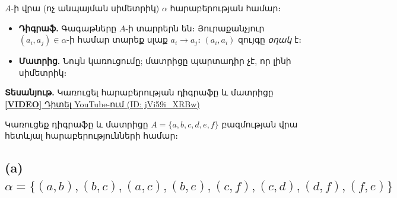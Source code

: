 \documentclass[12pt, a4paper]{article}
\begin{document}
\begin{theorybox}
$A$-ի վրա (ոչ անպայման սիմետրիկ) $\alpha$ հարաբերության համար։
\begin{itemize}[nosep]
  \item \textbf{Դիգրաֆ.} Գագաթները $A$-ի տարրերն են։ Յուրաքանչյուր $(a_i,a_j) \in \alpha$-ի համար տարեք սլաք $a_i \to a_j$։ $(a_i,a_i)$ զույգը \emph{օղակ} է։
  \item \textbf{Մատրից.} Նույն կառուցումը; մատրիցը պարտադիր չէ, որ լինի սիմետրիկ։
\end{itemize}
\end{theorybox}

\begin{tcolorbox}[colback=white, colframe=gray!50, arc=2mm, width=0.9\textwidth, halign=center]
  \textbf{Տեսանյութ.} Կառուցել հարաբերության դիգրաֆը և մատրիցը \\
  \href{https://youtu.be/jVi59i_XRBw}{\textbf{[VIDEO]} Դիտել YouTube-ում (ID: jVi59i\_XRBw)}
\end{tcolorbox}

\begin{problembox}
Կառուցեք դիգրաֆը և մատրիցը $A = \{a, b, c, d, e, f\}$ բազմության վրա հետևյալ հարաբերությունների համար։
\end{problembox}


\subsection*{(a)\; $\alpha = \{(a,b),(b,c),(a,c),(b,e),(c,f),(c,d),(d,f),(f,e)\}$}

\begin{center}
\end{center}
\end{document}
